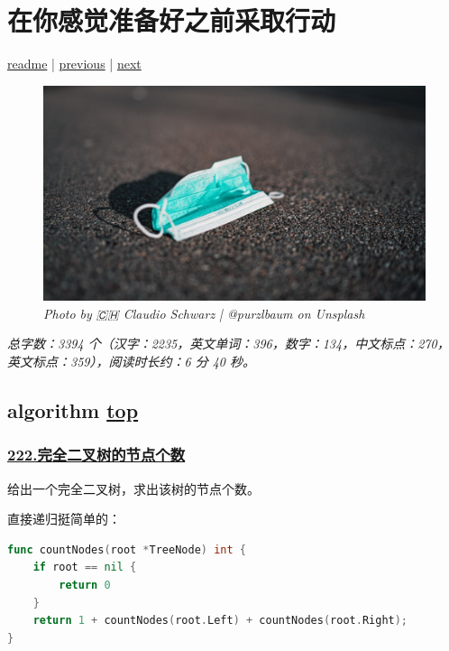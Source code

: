 \chapter{在你感觉准备好之前采取行动}\label{chap:w5}

\noindent \href{https://github.com/taseikyo/arts}{readme} | \hyperref[chap:w4]{previous} | \hyperref[chap:w6]{next}

\begin{figure}[htbp]
  \centering
    \includegraphics[width=\textwidth]{../images/2020/12/claudio-schwarz-purzlbaum-Zh-btVpBcdw-unsplash.jpg}
  \caption{\textit{Photo by 🇨🇭 Claudio Schwarz | @purzlbaum on Unsplash}}
\end{figure}


\textit{总字数：3394 个（汉字：2235，英文单词：396，数字：134，中文标点：270，英文标点：359），阅读时长约：6 分 40 秒。}

\section{algorithm \hyperref[chap:w5]{top}}\label{w5:algorithm}

\subsection{\href{https://leetcode-cn.com/problems/count-complete-tree-nodes/}{222.完全二叉树的节点个数}}

给出一个完全二叉树，求出该树的节点个数。

直接递归挺简单的：

\begin{lstlisting}[language=go]
func countNodes(root *TreeNode) int {
	if root == nil {
		return 0
	}
	return 1 + countNodes(root.Left) + countNodes(root.Right);
}
\end{lstlisting}

